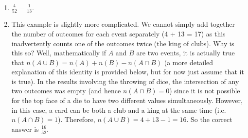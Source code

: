 {\begin{mdframed}[linewidth=4, leftmargin=40, rightmargin=40]
\begin{exercise}
\begin{enumerate}[noitemsep, label=\textbf{Step} \textbf{\arabic*}. ]
        \item  
        \label{m39377*id112208}$\frac{4}{52}=\frac{1}{13}$.\par 
        \item  
        \label{m39377*id112236}This example is slightly more complicated. We cannot
simply add together the number of outcomes for each event separately
(4 + 13 = 17) as this inadvertently counts one of the outcomes twice (the king
of clubs). Why is this so? Well, mathematically if $A$ and $B$ are two events, it is actually true that 
$n\left(A\cup B\right)=n\left(A\right)+n\left(B\right)-n\left(A\cap B\right)$ (a more detailed explanation of this identity is provided below, but for now just assume that it is true). In the results involving the
throwing of dice, the intersection of any two outcomes was empty (and hence
$n\left(A\cap B\right)=0$)
since it is not possible for the top face of a die to have two different values
simultaneously. However, in this case, a card can be both a club and a king at
the same time (i.e. $n\left(A\cap B\right)=1$).
Therefore, $n\left(A\cup B\right)=4+13-1=16$. So the correct answer is $\frac{16}{52}$.
 \par 
        \end{enumerate}
    \end{exercise}
    \end{mdframed}
    }
    \noindent
\label{m39377*secfhsst!!!underscore!!!id343}
